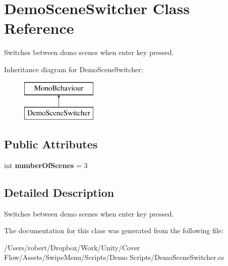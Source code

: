 \hypertarget{class_demo_scene_switcher}{}\section{Demo\+Scene\+Switcher Class Reference}
\label{class_demo_scene_switcher}


Switches between demo scenes when enter key pressed.  


Inheritance diagram for Demo\+Scene\+Switcher\+:\begin{figure}[H]
\begin{center}
\leavevmode
\includegraphics[height=2.000000cm]{class_demo_scene_switcher}
\end{center}
\end{figure}
\subsection*{Public Attributes}
\begin{DoxyCompactItemize}
\item 
\hypertarget{class_demo_scene_switcher_a761bbb8d1fbeb9f9f572f7677765dab8}{}int {\bfseries number\+Of\+Scenes} = 3\label{class_demo_scene_switcher_a761bbb8d1fbeb9f9f572f7677765dab8}

\end{DoxyCompactItemize}


\subsection{Detailed Description}
Switches between demo scenes when enter key pressed. 



The documentation for this class was generated from the following file\+:\begin{DoxyCompactItemize}
\item 
/\+Users/robert/\+Dropbox/\+Work/\+Unity/\+Cover Flow/\+Assets/\+Swipe\+Menu/\+Scripts/\+Demo Scripts/Demo\+Scene\+Switcher.\+cs\end{DoxyCompactItemize}
